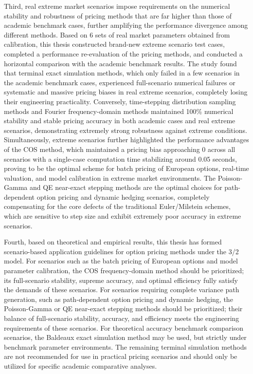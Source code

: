 Third, real extreme market scenarios impose requirements on the numerical stability and robustness of pricing methods that are far higher than those of academic benchmark cases, further amplifying the performance divergence among different methods. Based on 6 sets of real market parameters obtained from calibration, this thesis constructed brand-new extreme scenario test cases, completed a performance re-evaluation of the pricing methods, and conducted a horizontal comparison with the academic benchmark results. The study found that terminal exact simulation methods, which only failed in a few scenarios in the academic benchmark cases, experienced full-scenario numerical failures or systematic and massive pricing biases in real extreme scenarios, completely losing their engineering practicality. Conversely, time-stepping distribution sampling methods and Fourier frequency-domain methods maintained 100\% numerical stability and stable pricing accuracy in both academic cases and real extreme scenarios, demonstrating extremely strong robustness against extreme conditions. Simultaneously, extreme scenarios further highlighted the performance advantages of the COS method, which maintained a pricing bias approaching 0 across all scenarios with a single-case computation time stabilizing around 0.05 seconds, proving to be the optimal scheme for batch pricing of European options, real-time valuation, and model calibration in extreme market environments. The Poisson-Gamma and QE near-exact stepping methods are the optimal choices for path-dependent option pricing and dynamic hedging scenarios, completely compensating for the core defects of the traditional Euler/Milstein schemes, which are sensitive to step size and exhibit extremely poor accuracy in extreme scenarios.

Fourth, based on theoretical and empirical results, this thesis has formed scenario-based application guidelines for option pricing methods under the 3/2 model. For scenarios such as the batch pricing of European options and model parameter calibration, the COS frequency-domain method should be prioritized; its full-scenario stability, supreme accuracy, and optimal efficiency fully satisfy the demands of these scenarios. For scenarios requiring complete variance path generation, such as path-dependent option pricing and dynamic hedging, the Poisson-Gamma or QE near-exact stepping methods should be prioritized; their balance of full-scenario stability, accuracy, and efficiency meets the engineering requirements of these scenarios. For theoretical accuracy benchmark comparison scenarios, the Baldeaux exact simulation method may be used, but strictly under benchmark parameter environments. The remaining terminal simulation methods are not recommended for use in practical pricing scenarios and should only be utilized for specific academic comparative analyses.


